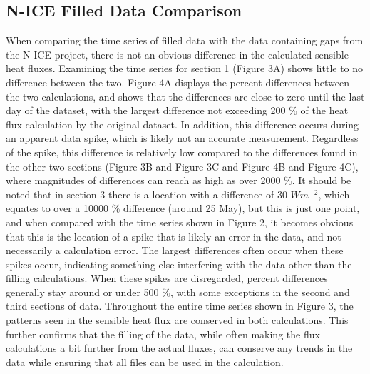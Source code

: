 

\subsection{N-ICE Filled Data Comparison}

When comparing the time series of filled data with the data containing gaps from the N-ICE project, there is not an obvious difference in the calculated sensible heat fluxes. Examining the time series for section 1 (Figure 3A) shows little to no difference between the two. Figure 4A displays the percent differences between the two calculations, and shows that the differences are close to zero until the last day of the dataset, with the largest difference not exceeding 200 $\%$ of the heat flux calculation by the original dataset. In addition, this difference occurs during an apparent data spike, which is likely not an accurate measurement. Regardless of the spike, this difference is relatively low compared to the differences found in the other two sections (Figure 3B and Figure 3C and Figure 4B and Figure 4C), where magnitudes of differences can reach as high as over 2000 $\%$. It should be noted that in section 3 there is a location with a difference of 30 $Wm^{-2}$, which equates to over a 10000 $\%$ difference (around 25 May), but this is just one point, and when compared with the time series shown in Figure 2, it becomes obvious that this is the location of a spike that is likely an error in the data, and not necessarily a calculation error. The largest differences often occur when these spikes occur, indicating something else interfering with the data other than the filling calculations. When these spikes are disregarded, percent differences generally stay around or under 500 $\%$, with some exceptions in the second and third sections of data. Throughout the entire time series shown in Figure 3, the patterns seen in the sensible heat flux are conserved in both calculations. This further confirms that the filling of the data, while often making the flux calculations a bit further from the actual fluxes, can conserve any trends in the data while ensuring that all files can be used in the calculation. 

